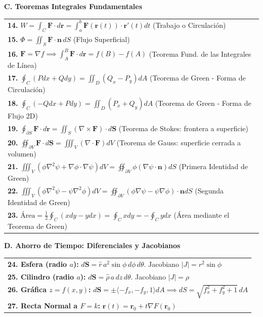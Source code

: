 \documentclass[10pt, landscape, twocolumn]{article}
\begin{document}
\newpage
{\color{themeblue}\normalsize\bfseries C. Teoremas Integrales Fundamentales} \par
\vspace{-0.2em}
\begin{tabularx}{\linewidth}{|X|}
\hline
\textbf{14.} $W = \int_C \mathbf{F} \cdot d\mathbf{r} = \int_a^b \mathbf{F}(\mathbf{r}(t)) \cdot \mathbf{r}'(t) dt$ (Trabajo o Circulación) \\
\textbf{15.} $\Phi = \iint_S \mathbf{F} \cdot \mathbf{n} \, dS$ (Flujo Superficial) \\
\textbf{16.} $\mathbf{F} = \nabla f \implies \int_A^B \mathbf{F} \cdot d\mathbf{r} = f(B) - f(A)$ (Teorema Fund. de las Integrales de Línea) \\
\textbf{17.} $\oint_C (P dx + Q dy) = \iint_D (Q_x - P_y) dA$ (Teorema de Green - Forma de Circulación) \\
\textbf{18.} $\oint_C (-Q dx + P dy) = \iint_D (P_x + Q_y) dA$ (Teorema de Green - Forma de Flujo 2D) \\
\textbf{19.} $\oint_{\partial S} \mathbf{F} \cdot d\mathbf{r} = \iint_S (\nabla \times \mathbf{F}) \cdot d\mathbf{S}$ (Teorema de Stokes: frontera a superficie) \\
\textbf{20.} $\oiint_{\partial V} \mathbf{F} \cdot d\mathbf{S} = \iiint_V (\nabla \cdot \mathbf{F}) dV$ (Teorema de Gauss: superficie cerrada a volumen) \\
\textbf{21.} $\iiint_V (\phi\nabla^2\psi + \nabla\phi\cdot\nabla\psi)dV = \oiint_{\partial V} \phi(\nabla\psi\cdot\mathbf{n})dS$ (Primera Identidad de Green) \\
\textbf{22.} $\iiint_V (\phi\nabla^2\psi - \psi\nabla^2\phi)dV = \oiint_{\partial V} (\phi\nabla\psi - \psi\nabla\phi)\cdot\mathbf{n} dS$ (Segunda Identidad de Green) \\
\textbf{23.} $\text{Área} = \frac{1}{2} \oint_C (x dy - y dx) = \oint_C x dy = -\oint_C y dx$ (Área mediante el Teorema de Green) \\
\hline
\end{tabularx}

\vspace{0.6em}
{\color{themeblue}\normalsize\bfseries D. Ahorro de Tiempo: Diferenciales y Jacobianos} \par
\vspace{-0.2em}
\begin{tabularx}{\linewidth}{|X|}
\hline
\textbf{24. Esfera (radio $a$):} $d\mathbf{S} = \hat{r} \, a^2 \sin\phi \, d\phi \, d\theta$. Jacobiano $|J| = r^2\sin\phi$ \\
\textbf{25. Cilindro (radio $a$):} $d\mathbf{S} = \hat{\rho} \, a \, dz \, d\theta$. Jacobiano $|J| = \rho$ \\
\textbf{26. Gráfica $z = f(x,y)$:} $d\mathbf{S} = \pm \langle -f_x, -f_y, 1 \rangle dA \implies dS = \sqrt{f_x^2 + f_y^2 + 1} \, dA$ \\
\textbf{27. Recta Normal a $F=k$:} $\mathbf{r}(t) = \mathbf{r}_0 + t\nabla F(\mathbf{r}_0)$ \\
\hline
\end{tabularx}
\end{document}
